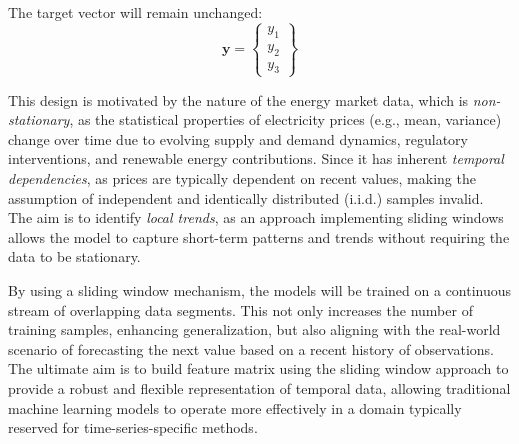 \documentclass[12pt]{report} %
\begin{document}
The target vector will remain unchanged:
\begin{equation*}
\mathbf{y} = \begin{Bmatrix}
y_1 \\
y_2 \\
y_3
\end{Bmatrix}
\end{equation*}

This design is motivated by the nature of the energy market data, which is \textit{non-stationary}, as the statistical properties of electricity prices (e.g., mean, variance) change over time due to evolving supply and demand dynamics, regulatory interventions, and renewable energy contributions. Since it has inherent \textit{temporal dependencies}, as prices are typically dependent on recent values, making the assumption of independent and identically distributed (i.i.d.) samples invalid. The aim is to identify \textit{local trends}, as an approach implementing sliding windows allows the model to capture short-term patterns and trends without requiring the data to be stationary.

By using a sliding window mechanism, the models will be trained on a continuous stream of overlapping data segments. This not only increases the number of training samples, enhancing generalization, but also aligning with the real-world scenario of forecasting the next value based on a recent history of observations. The ultimate aim is to build feature matrix using the sliding window approach to provide a robust and flexible representation of temporal data, allowing traditional machine learning models to operate more effectively in a domain typically reserved for time-series-specific methods.

    
    
    

\end{document}
